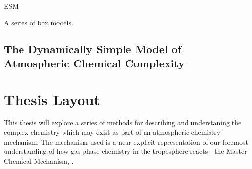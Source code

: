 ESM

 A series of box models.


 \subsection{The Dynamically Simple Model of Atmospheric Chemical Complexity}









\section{Thesis Layout}
This thesis will explore a series of methods for describing and understaning the complex chemistry which may exist as part of an atmospheric chemistry mechanism. The mechanism used is a near-explicit representation of our foremost understanding of how gas phase chemistry in the troposphere reacts - the Master Chemical Mechanism, \citep{mcm}.

